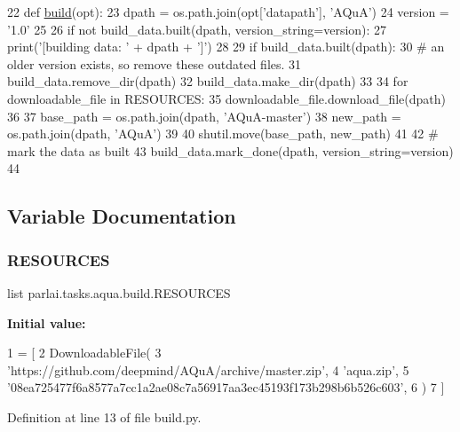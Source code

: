 \begin{DoxyCode}
22 \textcolor{keyword}{def }\hyperlink{namespacedialog__babi__feedback_1_1build_a7a9d289f7493a5ded13c4b7f071b6184}{build}(opt):
23     dpath = os.path.join(opt[\textcolor{stringliteral}{'datapath'}], \textcolor{stringliteral}{'AQuA'})
24     version = \textcolor{stringliteral}{'1.0'}
25 
26     \textcolor{keywordflow}{if} \textcolor{keywordflow}{not} build\_data.built(dpath, version\_string=version):
27         print(\textcolor{stringliteral}{'[building data: '} + dpath + \textcolor{stringliteral}{']'})
28 
29         \textcolor{keywordflow}{if} build\_data.built(dpath):
30             \textcolor{comment}{# an older version exists, so remove these outdated files.}
31             build\_data.remove\_dir(dpath)
32         build\_data.make\_dir(dpath)
33 
34         \textcolor{keywordflow}{for} downloadable\_file \textcolor{keywordflow}{in} RESOURCES:
35             downloadable\_file.download\_file(dpath)
36 
37         base\_path = os.path.join(dpath, \textcolor{stringliteral}{'AQuA-master'})
38         new\_path = os.path.join(dpath, \textcolor{stringliteral}{'AQuA'})
39 
40         shutil.move(base\_path, new\_path)
41 
42         \textcolor{comment}{# mark the data as built}
43         build\_data.mark\_done(dpath, version\_string=version)
44 \end{DoxyCode}


\subsection{Variable Documentation}
\mbox{\label{namespaceparlai_1_1tasks_1_1aqua_1_1build_a5471ace3ef77263affdc920e7c92b948}} 
\subsubsection{\texorpdfstring{R\+E\+S\+O\+U\+R\+C\+ES}{RESOURCES}}
{\footnotesize\ttfamily list parlai.\+tasks.\+aqua.\+build.\+R\+E\+S\+O\+U\+R\+C\+ES}

{\bfseries Initial value\+:}
\begin{DoxyCode}
1 =  [
2     DownloadableFile(
3         \textcolor{stringliteral}{'https://github.com/deepmind/AQuA/archive/master.zip'},
4         \textcolor{stringliteral}{'aqua.zip'},
5         \textcolor{stringliteral}{'08ea725477f6a8577a7cc1a2ae08c7a56917aa3ec45193f173b298b6b526c603'},
6     )
7 ]
\end{DoxyCode}


Definition at line 13 of file build.\+py.

